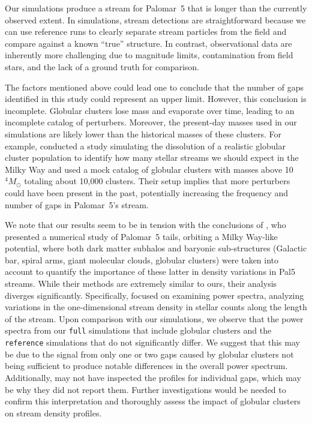 \documentclass{aa}
\begin{document}
  
  Our simulations produce a stream for Palomar~5 that is longer than the currently observed extent. In simulations, stream detections are straightforward because we can use reference runs to clearly separate stream particles from the field and compare against a known ``true'' structure. In contrast, observational data are inherently more challenging due to magnitude limits, contamination from field stars, and the lack of a ground truth for comparison. 
  
  The factors mentioned above could lead one to conclude that the number of gaps identified in this study could represent an upper limit. However, this conclusion is incomplete. Globular clusters lose mass and evaporate over time, leading to an incomplete catalog of perturbers. Moreover, the present-day masses used in our simulations are likely lower than the historical masses of these clusters. For example, \citet{2024ApJ...976...54P} conducted a study simulating the dissolution of a realistic globular cluster population to identify how many stellar streams we should expect in the Milky Way and used a mock catalog of globular clusters with masses above 10$^4 M_\odot$ totaling about 10,000 clusters. Their setup implies that more perturbers could have been present in the past, potentially increasing the frequency and number of gaps in Palomar~5's stream.
  

  We note that our results seem to be in tension with the conclusions of \citet{2019MNRAS.484.2009B}, who presented a numerical study of Palomar~5 tails, orbiting a Milky Way-like potential, where both dark matter subhalos and baryonic sub-structures (Galactic bar, spiral arms, giant molecular clouds, globular clusters) were taken into account to quantify the importance of these latter in density variations in Pal5 streams. While their methods are extremely similar to ours, their analysis diverges significantly. Specifically, \citet{2019MNRAS.484.2009B} focused on examining power spectra, analyzing variations in the one-dimensional stream density in stellar counts along the length of the stream. Upon comparison with our simulations, we observe that the power spectra from our \texttt{full} simulations that include globular clusters and the \texttt{reference} simulations that do not significantly differ. We suggest that this may be due to the signal from only one or two gaps caused by globular clusters not being sufficient to produce notable differences in the overall power spectrum. Additionally, \citet{2019MNRAS.484.2009B} may not have inspected the profiles for individual gaps, which may be why they did not report them. Further investigations would be needed to confirm this interpretation and thoroughly assess the impact of globular clusters on stream density profiles. \\
\end{document}
